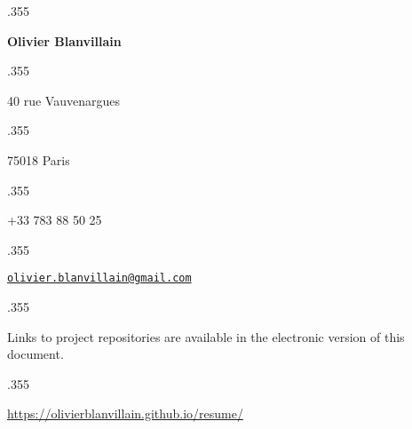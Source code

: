 \documentclass[margin, a4paper]{res}
\let\link\href
\renewcommand{\href}[2]{\link{#1}{\scriptsize{\faExternalLink}}}
\newcommand{\centered}[1]{\moveleft.355\hoffset\centerline{#1}}
\begin{document}
\centered{\LARGE\textbf{Olivier Blanvillain}}
\vspace{3pt}
\centered{40 rue Vauvenargues}
\centered{75018 Paris}
\vspace{3pt}
\centered{+33 783 88 50 25}
\centered{\link{mailto:olivier.blanvillain@gmail.com}{\texttt{olivier.blanvillain@gmail.com}}}

\begin{resume}
  
\end{resume}

\vspace{25pt}

\centered{\footnotesize Links to project repositories are available in the electronic version of this document.}
\centered{\footnotesize\url{https://olivierblanvillain.github.io/resume/}}
\end{document}
